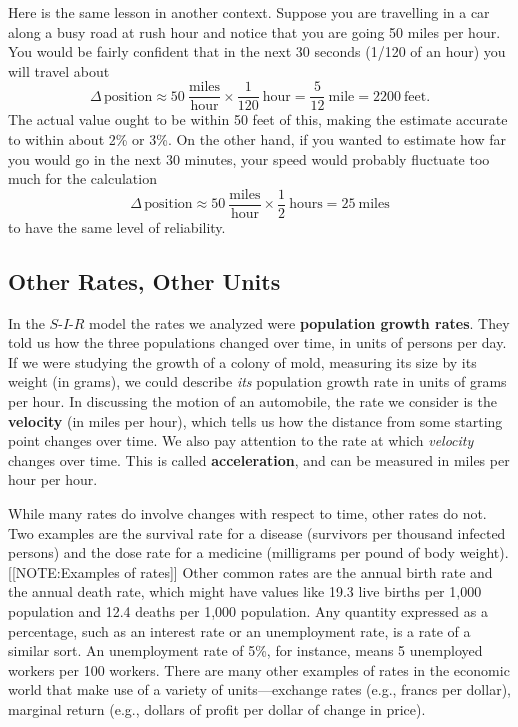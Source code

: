 Here is the same lesson in another context.  Suppose you are
travelling in a car along a busy road at rush hour and notice that you
are going 50 miles per hour.  You would be fairly confident that in
the next 30 seconds (1/120 of an hour) you will travel about
\[
\Delta \, \mbox{position} \approx
		50 \ \frac{\mbox{miles}}{\mbox{hour}} \times 
		\dfrac{1}{120} \ \mbox{hour} = 
		\dfrac{5}{12} \ \mbox{mile} 
		= 2200 \ \mbox{feet}.
\]
The actual value ought to be within 50 feet of this, making the
estimate accurate to within about 2\% or 3\%.  On the other hand, if
you wanted to estimate how far you would go in the next 30 minutes,
your speed would probably fluctuate too much for the calculation
\[
\Delta \, \mbox{position} \approx 
		50 \ \frac{\mbox{miles}}{\mbox{hour}} \times 
		\dfrac{1}{2} \ \mbox{hours} = 
		25 \ \mbox{miles}
\]
to have the same level of reliability.  

\subsection{Other Rates, Other Units}
\label{subsec:other-rates-other-units}

In the $S$-$I$-$R$ model the rates we analyzed were {\bf population
  growth rates}. They told us how the three populations changed over
time, in units of persons per day.  If we were studying the growth of
a colony of mold, measuring its size by its weight (in grams), we
could describe {\em its\/} population growth rate in units of grams
per hour.  In discussing the motion of an automobile, the rate we
consider is the {\bf velocity} (in miles per hour),
which tells us how the distance from some starting point changes over
time.  We also pay attention to the rate at which {\em velocity\/}
changes over time.  This is called {\bf
  acceleration}, and can be measured in miles per
hour per hour.

While many rates do involve changes with respect to time, other rates
do not.  Two examples are the survival rate for a
disease (survivors per thousand infected persons) and the dose
rate for a medicine (milligrams per pound of body
weight).  [[NOTE:Examples of rates]] Other common rates are the annual
birth rate  and the annual death rate, which
might have values like 19.3 live births per 1,000 population and 12.4
deaths per 1,000 population.  Any quantity expressed as a percentage,
such as an interest rate or an unemployment rate, is a rate of a
similar sort.  An unemployment rate of 5\%, for instance, means 5
unemployed workers per 100 workers.  There are many other examples of
rates in the economic world that make use of a variety of
units---exchange rates (e.g., francs per dollar), marginal return
(e.g., dollars of profit per dollar of change in price).

